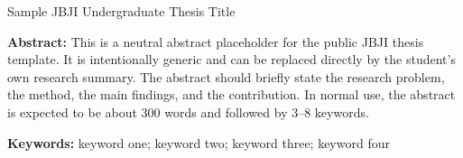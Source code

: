 \thispagestyle{plain}

{
  \centering\jnuthssAbstractTitleFont Sample JBJI Undergraduate Thesis Title\par
  \vspace{\jnuthssAbstractTitleInnerGap}
}

\vspace{\jnuthssAbstractBodyTopSpace}

{\jnuthssAbstractBodyStyle\noindent\textbf{Abstract:}
This is a neutral abstract placeholder for the public JBJI thesis template. It
is intentionally generic and can be replaced directly by the student's own
research summary. The abstract should briefly state the research problem, the
method, the main findings, and the contribution. In normal use, the abstract is
expected to be about 300 words and followed by 3--8 keywords.
}

\vspace{\jnuthssAbstractKeywordsTopSpace}

{\jnuthssAbstractBodyStyle\noindent\textbf{Keywords:} keyword one; keyword two; keyword three; keyword four}
